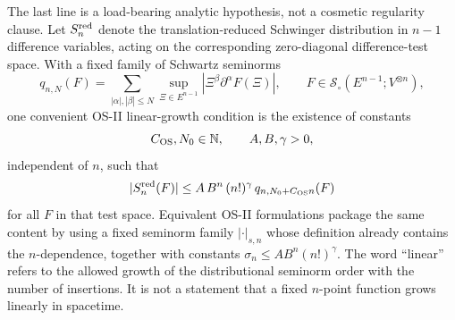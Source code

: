 The last line is a load-bearing analytic hypothesis, not a cosmetic
regularity clause.  Let \(S_n^{\rm red}\) denote the translation-reduced
Schwinger distribution in \(n-1\) difference variables, acting on the
corresponding zero-diagonal difference-test space.  With a fixed family of
Schwartz seminorms
\[
  q_{n,N}(F)
  =
  \sum_{|\alpha|,|\beta|\le N}
  \sup_{\Xi\in E^{n-1}}
  \left|\Xi^\beta\partial^\alpha F(\Xi)\right|,
  \qquad F\in\mathcal S_\circ(E^{n-1};V^{\otimes n}),
\]
one convenient OS-II linear-growth condition is the existence of constants
\[
  C_{\rm OS},N_0\in\mathbb N,\qquad
  A,B,\gamma>0,
\]
independent of \(n\), such that
\begin{equation}
  |S_n^{\rm red}(F)|
  \le
  A\,B^n\,(n!)^\gamma\,
  q_{n,N_0+C_{\rm OS}n}(F)
  \label{eq:os-linear-growth-condition}
\end{equation}
for all \(F\) in that test space.  Equivalent OS-II formulations package the
same content by using a fixed seminorm family \(|\cdot|_{s,n}\) whose
definition already contains the \(n\)-dependence, together with constants
\(\sigma_n\le A B^n(n!)^\gamma\).  The word ``linear'' refers to the allowed
growth of the distributional seminorm order with the number of insertions.  It
is not a statement that a fixed \(n\)-point function grows linearly in
spacetime.

